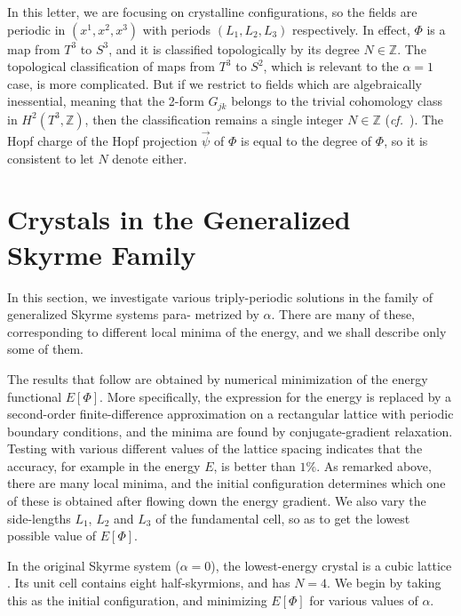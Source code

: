 \documentclass[5p]{elsarticle}
\newcommand{\ZZ}{\mathbb Z}
\begin{document}
In this letter, we are focusing on crystalline configurations, so
the fields are periodic in $(x^1,x^2,x^3)$ with periods $(L_1,L_2,L_3)$
respectively. In effect, $\Phi$ is a map from $T^3$ to $S^3$, and it
is classified topologically by its degree $N\in\ZZ$. The topological
classification of maps from $T^3$ to $S^2$, which is relevant to the
$\alpha=1$ case, is more complicated. But if we restrict to fields which
are algebraically inessential, meaning that the 2-form $G_{jk}$ belongs to
the trivial cohomology class in $H^2(T^3,\ZZ)$, then the classification
remains a single integer $N\in\ZZ$ ({\sl cf.}\ \cite{KS06}). The
Hopf charge of the Hopf projection $\vec\psi$ of $\Phi$ is equal to the
degree of $\Phi$, so it is consistent to let $N$ denote either.


\section{Crystals in the Generalized Skyrme Family}

In this section, we investigate various triply-periodic solutions
in the family of generalized Skyrme systems para- metrized by $\alpha$.
There are many of these, corresponding to different local minima
of the energy, and we shall describe only some of them.

The results that follow are obtained by numerical minimization of the
energy functional $E[\Phi]$. More specifically, the expression for the
energy is replaced by a second-order finite-difference approximation
on a rectangular lattice with periodic boundary conditions, and the
minima are found by conjugate-gradient relaxation. Testing with
various different values of the lattice spacing indicates that the
accuracy, for example in the energy $E$, is better than $1\%$.
As remarked above, there are many local minima, and the initial
configuration determines which one of these is obtained after flowing
down the energy gradient. We also vary the side-lengths $L_1$, $L_2$
and $L_3$ of the fundamental cell, so as to get the lowest possible
value of $E[\Phi]$. 

In the original Skyrme system ($\alpha=0$), the lowest-energy crystal
is a cubic lattice \cite{MS04}. Its unit cell contains eight half-skyrmions,
and has $N=4$. We begin by taking this as the initial configuration, and
minimizing $E[\Phi]$ for various values of $\alpha$.
\end{document}
